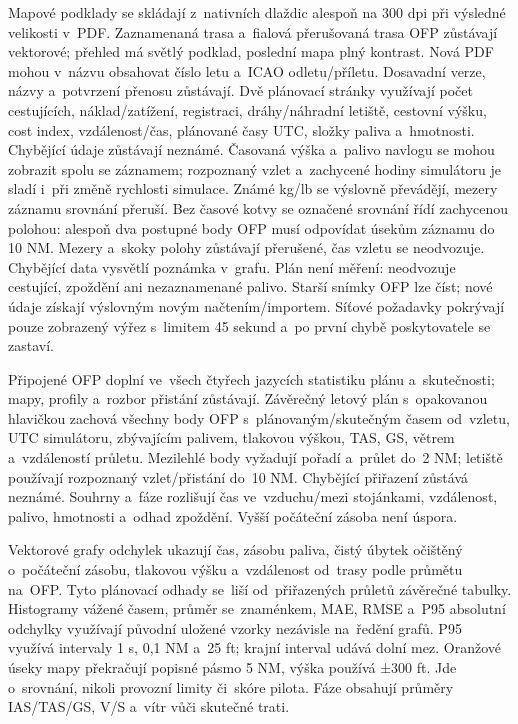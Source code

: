 \documentclass[11pt,a4paper]{article}
\begin{document}
Mapové podklady se skládají z~nativních dlaždic alespoň na 300 dpi při
výsledné velikosti v~PDF. Zaznamenaná trasa a~fialová přerušovaná trasa OFP
zůstávají vektorové; přehled má světlý podklad, poslední mapa plný kontrast.
Nová PDF mohou v~názvu obsahovat číslo letu a~ICAO odletu/příletu. Dosavadní
verze, názvy a~potvrzení přenosu zůstávají. Dvě plánovací stránky využívají
počet
cestujících, náklad/zatížení, registraci, dráhy/náhradní letiště, cestovní
výšku,
cost index, vzdálenost/čas, plánované časy UTC, složky paliva a~hmotnosti.
Chybějící údaje zůstávají neznámé. Časovaná výška a~palivo navlogu se mohou
zobrazit spolu se záznamem; rozpoznaný vzlet a~zachycené hodiny simulátoru je
sladí i~při změně rychlosti simulace. Známé kg/lb se výslovně převádějí, mezery
záznamu srovnání přeruší. Bez časové kotvy se označené srovnání řídí zachycenou
polohou: alespoň dva postupné body OFP musí odpovídat úsekům záznamu do 10 NM.
Mezery a~skoky polohy zůstávají přerušené, čas vzletu se neodvozuje. Chybějící
data vysvětlí poznámka v~grafu. Plán není měření: neodvozuje cestující,
zpoždění ani nezaznamenané palivo. Starší snímky OFP lze číst; nové údaje
získají výslovným novým načtením/importem. Síťové požadavky pokrývají pouze
zobrazený výřez s~limitem 45 sekund a~po první chybě poskytovatele se zastaví.

Připojené OFP doplní ve~všech čtyřech jazycích statistiku plánu a~skutečnosti;
mapy, profily a~rozbor přistání zůstávají. Závěrečný letový plán s~opakovanou
hlavičkou zachová všechny body OFP s~plánovaným/skutečným časem od~vzletu,
UTC simulátoru, zbývajícím palivem, tlakovou výškou, TAS, GS, větrem
a~vzdáleností průletu. Mezilehlé body vyžadují pořadí a~průlet do~2 NM;
letiště používají rozpoznaný vzlet/přistání do~10 NM. Chybějící přiřazení
zůstává neznámé. Souhrny a~fáze rozlišují čas ve~vzduchu/mezi stojánkami,
vzdálenost, palivo, hmotnosti a~odhad zpoždění. Vyšší počáteční zásoba není
úspora.

Vektorové grafy odchylek ukazují čas, zásobu paliva, čistý úbytek očištěný
o~počáteční zásobu, tlakovou výšku a~vzdálenost od~trasy podle průmětu na~OFP.
Tyto plánovací odhady se~liší od~přiřazených průletů závěrečné tabulky.
Histogramy vážené časem, průměr se~znaménkem, MAE, RMSE a~P95 absolutní
odchylky využívají původní uložené vzorky nezávisle na~ředění grafů.
P95 využívá intervaly 1 s, 0,1 NM a~25 ft; krajní interval udává dolní mez.
Oranžové úseky mapy překračují popisné pásmo 5 NM, výška používá ±300 ft.
Jde o~srovnání, nikoli provozní limity či~skóre pilota. Fáze obsahují průměry
IAS/TAS/GS, V/S a~vítr vůči skutečné trati.
\end{document}
